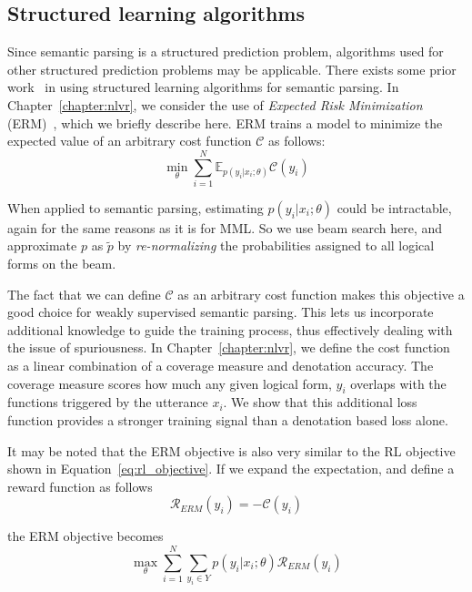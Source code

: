 \subsection{Structured learning algorithms}\label{sec:erm}
Since semantic parsing is a structured prediction problem, algorithms used for
other structured prediction problems may be applicable. 
There exists some prior work~\citep{IyyerSQA2016,guu2017bridging} in using 
structured learning algorithms for semantic parsing. In
Chapter~\ref{chapter:nlvr}, we consider the use of
\emph{Expected Risk Minimization} (ERM)~\citep{smith2006minimum}, which we
briefly describe here.  ERM trains a model to minimize the
expected value of an arbitrary cost function $\mathcal{C}$ as follows:
\begin{equation}
\min_{\theta} \sum_{i=1}^{N} \mathbb{E}_{p(y_i|x_i;
\theta)}\mathcal{C}(y_i) \label{eq:erm_objective}
\end{equation}

\noindent When applied to semantic parsing, estimating $p(y_i|x_i; \theta)$
could be intractable, again for the same reasons as it is for MML\@. So we use
beam search here, and approximate $p$ as $\tilde{p}$ by \emph{re-normalizing}
the probabilities assigned to all logical forms on the beam.

The fact that we can define $\mathcal{C}$ as an arbitrary cost function makes
this objective a good choice for weakly supervised semantic parsing. This lets
us incorporate additional knowledge to guide the training process,
thus effectively dealing with the issue of spuriousness. In
Chapter~\ref{chapter:nlvr}, we define the cost function as a linear combination
of a coverage measure and denotation accuracy. The coverage measure scores how
much any given logical form, $y_i$ overlaps with the functions triggered by the
utterance $x_i$. We show that this additional loss function provides a 
stronger training signal than a denotation based loss alone.

It may be noted that the ERM objective is also very similar to the RL objective
shown in Equation~\ref{eq:rl_objective}. If we expand the expectation, and 
define a reward function as follows
\begin{equation}
	\mathcal{R}_{ERM}(y_i) = -\mathcal{C}(y_i)
\end{equation}

\noindent the ERM objective becomes
\begin{equation}
	\max_{\theta} \sum_{i=1}^{N} \sum_{y_i \in Y} p(y_i|x_i;\theta)
	\mathcal{R}_{ERM}(y_i) \label{eq:erm_objective2}	
\end{equation}

